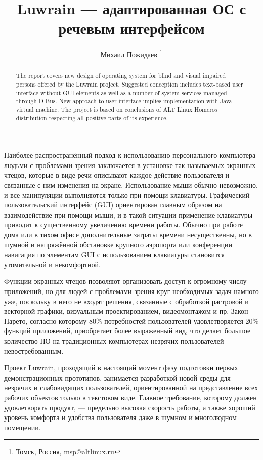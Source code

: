 \documentclass[10pt, a5paper]{article}
\begin{document}
\title{Luwrain — адаптированная ОС с речевым интерфейсом}
\author{Михаил Пожидаев \footnote{Томск, Россия, \url{msp@altlinux.ru}}}
\maketitle
\begin{abstract}
The report covers new design of operating system for blind and visual impaired persons offered by the Luwrain project. Suggested conception includes text-based user interface without GUI elements as well as a number of system services managed through D-Bus. New approach to user interface implies implementation with Java virtual machine. The project is based on conclusions of ALT Linux Homeros distribution respecting all positive parts of its experience.
\end{abstract}
Наиболее распространённый подход к использованию персонального компьютера людьми с проблемами зрения заключается в установке так называемых экранных чтецов, которые в виде речи описывают каждое действие пользователя и связанные с ним изменения на экране. Использование мыши обычно невозможно, и все манипуляции выполняются только при помощи клавиатуры. Графический пользовательский интерфейс (GUI) ориентирован главным образом на взаимодействие при помощи мыши, и в такой ситуации применение клавиатуры приводит к существенному увеличению времени работы. Обычно при работе дома или в тихом офисе дополнительные затраты времени несущественны, но в шумной и напряжённой обстановке крупного аэропорта или конференции навигация по элементам GUI с использованием клавиатуры становится утомительной и некомфортной.

Функции экранных чтецов позволяют организовать доступ к огромному числу приложений, но для людей с проблемами зрения круг необходимых задач намного уже, поскольку в него не входят решения, связанные с обработкой растровой и векторной графики, визуальным проектированием, видеомонтажом и пр. Закон Парето, согласно которому 80\% потребностей пользователей удовлетворяется 20\% функций приложений, приобретает более выраженный вид, что делает большое количество ПО на традиционных компьютерах незрячих пользователей невостребованным.

Проект Luwrain, проходящий в настоящий момент фазу подготовки первых демонстрационных прототипов, занимается разработкой новой среды для незрячих и слабовидящих пользователей, ориентированной на представление всех рабочих объектов только в текстовом виде. Главное требование, которому должен удовлетворять продукт, — предельно высокая скорость работы, а также хороший уровень комфорта и удобства пользователя даже в шумном и многолюдном помещении.
\end{document}
